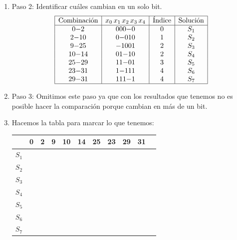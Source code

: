 \documentclass[12pt,letterpaper]{article}
\newcommand{\ekis}{\textcolor{dblue}{\ding{55}}}
\begin{document}
\begin{enumerate}[label=\arabic*.]
\begin{enumerate}[label=\arabic*)]
  \item Paso 2: Identificar cuáles cambian en un solo bit.
    \[
    \begin{array}{| c | c | c | c |}
      \hline
      \text{Combinación} & x_0\,x_1\,x_2\,x_3\,x_4 & \text{Índice} & \text{Solución} \\
      \hline
      0{-}2   & 000{-}0 & 0 & S_1 \\
      2{-}10  & 0{-}010 & 1 & S_2 \\
      9{-}25  & {-}1001 & 2 & S_3 \\
      10{-}14 & 01{-}10 & 2 & S_4 \\
      25{-}29 & 11{-}01 & 3 & S_5 \\
      23{-}31 & 1{-}111 & 4 & S_6 \\
      29{-}31 & 111{-}1 & 4 & S_7 \\
      \hline
    \end{array}
    \]

  \item Paso 3: Omitimos este paso ya que con los resultados que tenemos no es posible hacer la comparación porque cambian en más de un bit.

  \item Hacemos la tabla para marcar lo que tenemos:
    \begin{table}[H]
      \begin{center}
        \begin{tabular}{| c | c | c | c | c | c | c | c | c | c | c |}
          
          \hline 
          & 0 & 2 & 9 & 10 & 14 & 25 & 23 & 29 & 31   \\ \hline
          $S_1$ & \cellcolor{mostaza}\ekis & \cellcolor{mostaza}\ekis & & & & & & & \\ \hline
          $S_2$ & & \ekis & & \ekis & & & & & \\ \hline
          $S_3$ & & & \cellcolor{mostaza}\ekis & & & \cellcolor{mostaza}\ekis & & & \\ \hline
          $S_4$ & & & & \cellcolor{mostaza}\ekis & \cellcolor{mostaza}\ekis & & & & \\ \hline
          $S_5$ & & & & & & \ekis & & \ekis & \\ \hline
          $S_6$ & & & & & & & \cellcolor{mostaza}\ekis & & \cellcolor{mostaza}\ekis \\ \hline
          $S_7$ & & & & & & & & \cellcolor{mostaza}\ekis & \cellcolor{mostaza}\ekis \\ \hline
        \end{tabular}
      \end{center}
    \end{table}
  \end{enumerate}
  

\end{enumerate}
\end{document}
